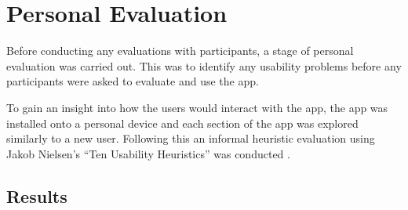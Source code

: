 \documentclass{l4proj}
\begin{document}


\section{Personal Evaluation}

Before conducting any evaluations with participants, a stage of personal evaluation was carried out. This was to identify any usability problems before any participants were asked to evaluate and use the app. 
 
To gain an insight into how the users would interact with the app, the app was installed onto a personal device and each section of the app was explored similarly to a new user. Following this an informal heuristic evaluation using Jakob Nielsen’s “Ten Usability Heuristics” was conducted \citep{Nielsen10}. 

\subsection{Results}
\end{document}
